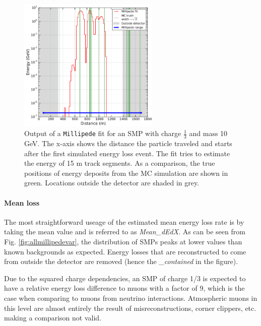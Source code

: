 \begin{figure}[ht]
\centering
\includegraphics[width=0.6\textwidth]{chapter8/img/millipedeStef.png}
\caption{Output of a \texttt{Millipede} fit for an SMP with charge $\frac{1}{3}$ and mass 10 GeV. The x-axis shows the distance the particle traveled and starts after the first simulated energy loss event. The fit tries to estimate the energy of 15 m track segments. As a comparison, the true positions of energy deposits from the MC simulation are shown in green. Locations outside the detector are shaded in grey.}
\label{fig:millipedeoutput}
\end{figure}

\paragraph{Mean loss}
The most straightforward useage of the estimated mean energy loss rate is by taking the mean value and is referred to as \textit{Mean\_dEdX}. As can be seen from Fig. \ref{fig:allmillipedevar}, the distribution of SMPs peaks at lower values than known backgrounds as expected. Energy losses that are reconstructed to come from outside the detector are removed (hence the \textit{\_contained} in the figure). 

Due to the squared charge dependencies, an SMP of charge 1/3 is expected to have a relative energy loss difference to muons with a factor of 9, which is the case when comparing to muons from neutrino interactions. Atmospheric muons in this level are almost entirely the result of misreconstructions, corner clippers, etc. making a comparison not valid.

